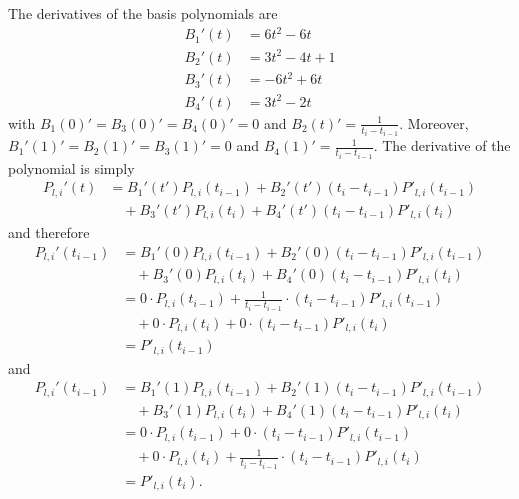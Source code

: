 The derivatives of the basis polynomials are 
\begin{align*}
B_1'(t) &= 6t^2 - 6t \\
B_2'(t) &= 3t^2 - 4t + 1 \\
B_3'(t) &= -6t^2 + 6t \\
B_4'(t) &= 3t^2 - 2t
\end{align*}
with $B_1(0)'=B_3(0)'=B_4(0)'=0$ and $B_2(t)'=\frac{1}{t_i - t_{i-1}}$. Moreover, $B_1'(1)'= B_2(1)'=B_3(1)'=0$ and $B_4(1)'=\frac{1}{t_i - t_{i-1}}$. The derivative of the polynomial is simply
\begin{align*}
P_{l,i}'(t) &= B_1'(t') P_{l,i}(t_{i-1}) + B_2'(t') (t_{i} - t_{i-1}) P'_{l,i}(t_{i-1})  \\& \quad + B_3'(t') P_{l,i}(t_{i}) + B_4'(t') (t_{i} - t_{i-1}) P'_{l,i}(t_{i})
\end{align*}
and therefore
\begin{align*}
P_{l,i}'(t_{i-1}) &= B_1'(0) P_{l,i}(t_{i-1}) + B_2'(0) (t_{i} - t_{i-1}) P'_{l,i}(t_{i-1})  \\& \quad + B_3'(0) P_{l,i}(t_{i}) + B_4'(0) (t_{i} - t_{i-1}) P'_{l,i}(t_{i}) \\
&= 0 \cdot P_{l,i}(t_{i-1}) + \frac{1}{t_i - t_{i-1}} \cdot(t_{i} - t_{i-1}) P'_{l,i}(t_{i-1})  \\& \quad + 0 \cdot P_{l,i}(t_{i}) + 0 \cdot (t_{i} - t_{i-1}) P'_{l,i}(t_{i}) \\
&=  P'_{l,i}(t_{i-1})
\end{align*}
and 
\begin{align*}
P_{l,i}'(t_{i-1}) &= B_1'(1) P_{l,i}(t_{i-1}) + B_2'(1) (t_{i} - t_{i-1}) P'_{l,i}(t_{i-1})  \\& \quad + B_3'(1) P_{l,i}(t_{i}) + B_4'(1) (t_{i} - t_{i-1}) P'_{l,i}(t_{i}) \\
&= 0 \cdot P_{l,i}(t_{i-1}) + 0 \cdot(t_{i} - t_{i-1}) P'_{l,i}(t_{i-1})  \\& \quad + 0 \cdot P_{l,i}(t_{i}) + \frac{1}{t_i - t_{i-1}} \cdot (t_{i} - t_{i-1}) P'_{l,i}(t_{i}) \\
&=  P'_{l,i}(t_{i}).
\end{align*}

